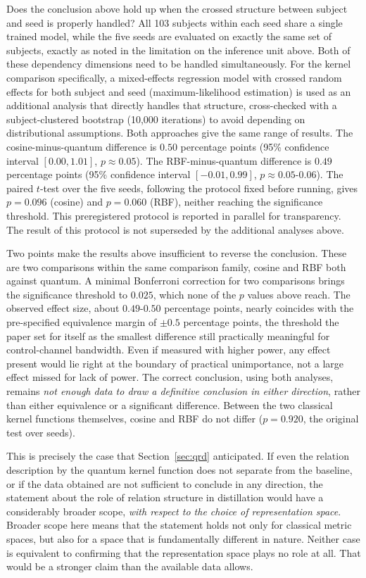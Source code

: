 Does the conclusion above hold up when the crossed structure between
subject and seed is properly handled? All 103 subjects within each
seed share a single trained model, while the five seeds are
evaluated on exactly the same set of subjects, exactly as noted in
the limitation on the inference unit above. Both of these dependency
dimensions need to be handled simultaneously. For the kernel
comparison specifically, a mixed-effects regression model with
crossed random effects for both subject and seed (maximum-likelihood
estimation) is used as an additional analysis that directly handles
that structure, cross-checked with a subject-clustered bootstrap
(10,000 iterations) to avoid depending on distributional
assumptions. Both approaches give the same range of results. The
cosine-minus-quantum difference is $0.50$ percentage points (95\%
confidence interval $[0.00, 1.01]$, $p \approx 0.05$). The
RBF-minus-quantum difference is $0.49$ percentage points (95\%
confidence interval $[-0.01, 0.99]$, $p \approx 0.05$-$0.06$). The
paired $t$-test over the five seeds, following the protocol fixed
before running, gives $p = 0.096$ (cosine) and $p = 0.060$ (RBF),
neither reaching the significance threshold. This preregistered
protocol is reported in parallel for transparency. The result of
this protocol is not superseded by the additional analyses above.

Two points make the results above insufficient to reverse the
conclusion. These are two comparisons within the same comparison
family, cosine and RBF both against quantum. A minimal Bonferroni
correction for two comparisons brings the significance threshold to
$0.025$, which none of the $p$ values above reach. The observed
effect size, about $0.49$-$0.50$ percentage points, nearly coincides
with the pre-specified equivalence margin of $\pm 0.5$ percentage
points, the threshold the paper set for itself as the smallest
difference still practically meaningful for control-channel
bandwidth. Even if measured with higher power, any effect present
would lie right at the boundary of practical unimportance, not a
large effect missed for lack of power. The correct conclusion, using
both analyses, remains \emph{not enough data to draw a definitive
conclusion in either direction}, rather than either equivalence or a
significant difference. Between the two classical kernel functions
themselves, cosine and RBF do not differ ($p = 0.920$, the original
test over seeds).

This is precisely the case that Section~\ref{sec:qrd} anticipated.
If even the relation description by the quantum kernel function does
not separate from the baseline, or if the data obtained are not
sufficient to conclude in any direction, the statement about the
role of relation structure in distillation would have a considerably
broader scope, \emph{with respect to the choice of representation
space}. Broader scope here means that the statement holds not only
for classical metric spaces, but also for a space that is
fundamentally different in nature. Neither case is equivalent to
confirming that the representation space plays no role at all. That
would be a stronger claim than the available data allows.

